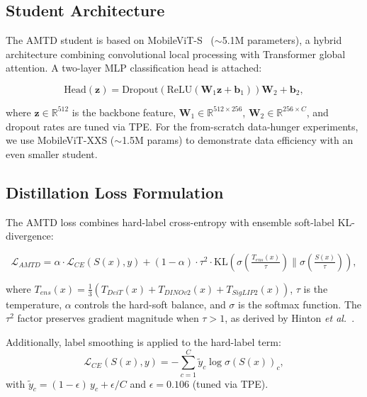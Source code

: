 \documentclass[journal]{IEEEtran}
\begin{document}
\subsection{Student Architecture}

The AMTD student is based on MobileViT-S~\cite{mehta2021mobilevit} ($\sim$5.1M parameters), a
hybrid architecture combining convolutional local processing with Transformer global attention.
A two-layer MLP classification head is attached:

\begin{equation}
    \text{Head}(\mathbf{z}) = \text{Dropout}(\text{ReLU}(\mathbf{W}_1\mathbf{z} + \mathbf{b}_1))\mathbf{W}_2 + \mathbf{b}_2,
\end{equation}

where $\mathbf{z} \in \mathbb{R}^{512}$ is the backbone feature, $\mathbf{W}_1 \in \mathbb{R}^{512 \times 256}$,
$\mathbf{W}_2 \in \mathbb{R}^{256 \times C}$, and dropout rates are tuned via TPE. For the from-scratch
data-hunger experiments, we use MobileViT-XXS ($\sim$1.5M params) to demonstrate data efficiency
with an even smaller student.

\subsection{Distillation Loss Formulation}

The AMTD loss combines hard-label cross-entropy with ensemble soft-label KL-divergence:

\begin{equation}
    \mathcal{L}_{AMTD} = \alpha \cdot \mathcal{L}_{CE}\!\left(S(x), y\right)
    + (1-\alpha) \cdot \tau^2 \cdot
    \text{KL}\!\left(\sigma\!\left(\tfrac{T_{ens}(x)}{\tau}\right) \Big\|
    \sigma\!\left(\tfrac{S(x)}{\tau}\right)\right),
    \label{eq:amtd_loss}
\end{equation}

where $T_{ens}(x) = \frac{1}{3}(T_{DeiT}(x) + T_{DINOv2}(x) + T_{SigLIP2}(x))$, $\tau$ is the
temperature, $\alpha$ controls the hard-soft balance, and $\sigma$ is the softmax function.
The $\tau^2$ factor preserves gradient magnitude when $\tau > 1$, as derived by Hinton
\textit{et al.}~\cite{hinton2015distilling}.

Additionally, label smoothing is applied to the hard-label term:
\begin{equation}
    \mathcal{L}_{CE}(S(x), y) = -\sum_{c=1}^{C} \tilde{y}_c \log \sigma(S(x))_c,
\end{equation}
with $\tilde{y}_c = (1 - \epsilon)\,y_c + \epsilon/C$ and $\epsilon = 0.106$ (tuned via TPE).
\end{document}
